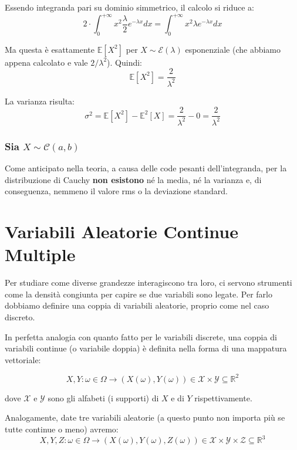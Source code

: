 Essendo integranda pari su dominio simmetrico, il calcolo si riduce a:
\begin{equation}
2 \cdot \int_{0}^{+\infty} x^2 \frac{\lambda}{2} e^{-\lambda x} dx = \int_{0}^{+\infty} x^2 \lambda e^{-\lambda x} dx
\end{equation}

Ma questa è esattamente $\mathbb{E}[X^2]$ per $X \sim \mathcal{E}(\lambda)$ esponenziale (che abbiamo appena calcolato e vale $2/\lambda^2$). Quindi:
\begin{equation}
\mathbb{E}[X^2] = \frac{2}{\lambda^2}
\end{equation}

La varianza risulta:
\begin{equation}
\sigma^2 = \mathbb{E}[X^2] - \mathbb{E}^2[X] = \frac{2}{\lambda^2} - 0 = \frac{2}{\lambda^2}
\end{equation}

\subsubsection{Sia $X \sim \mathcal{C}(a, b)$}
Come anticipato nella teoria, a causa delle code pesanti dell'integranda, per la distribuzione di Cauchy \textbf{non esistono} né la media, né la varianza e, di conseguenza, nemmeno il valore rms o la deviazione standard.

\section{Variabili Aleatorie Continue Multiple}

Per studiare come diverse grandezze interagiscono tra loro, ci servono strumenti come la densità congiunta per capire se due variabili sono legate. Per farlo dobbiamo definire una coppia di variabili aleatorie, proprio come nel caso discreto.

In perfetta analogia con quanto fatto per le variabili discrete, una coppia di variabili continue (o variabile doppia) è definita nella forma di una mappatura vettoriale:

\begin{equation}
X, Y : \omega \in \Omega \longrightarrow (X(\omega), Y(\omega)) \in \mathcal{X} \times \mathcal{Y} \subseteq \mathbb{R}^2
\end{equation}

dove $\mathcal{X}$ e $\mathcal{Y}$ sono gli alfabeti (i supporti) di $X$ e di $Y$ rispettivamente.

Analogamente, date tre variabili aleatorie (a questo punto non importa più se tutte continue o meno) avremo:
\begin{equation}
X, Y, Z : \omega \in \Omega \longrightarrow (X(\omega), Y(\omega), Z(\omega)) \in \mathcal{X} \times \mathcal{Y} \times \mathcal{Z} \subseteq \mathbb{R}^3
\end{equation}

